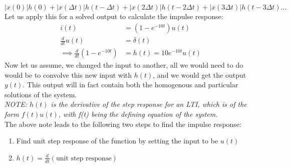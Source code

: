 \documentclass[nobib]{tufte-handout}
\begin{document}
\begin{equation*}
    |x(0)|h(0)+|x(\Delta t)|h(t-\Delta t)+|x(2\Delta t)|h(t-2\Delta t)+|x(3\Delta t)|h(t-3\Delta t)\ldots
\end{equation*}
Let us apply this for a solved output to calculate the impulse response:
\begin{align*}
    i(t)                              & = (1-e^{-10t})u(t)      \\
    \frac{d}{dt}u(t)                  & = \delta(t)             \\
    \implies \frac{d}{dt}(1-e^{-10t}) & = h(t) = 10e^{-10t}u(t)
\end{align*}
Now let us assume, we changed the input to another, all we would need to do would be to convolve this new input with $h(t)$, and we would get the output $y(t)$. This output will in fact contain both the homogenous and particular solutions of the system.\\
\textit{NOTE: $h(t)$ is the derivative of the step response for an LTI, which is of the form $f(t)u(t)$, with f(t) being the defining equation of the system.}\\
The above note leads to the following two steps to find the impulse response:
\begin{enumerate}
    \item Find unit step response of the function by setting the input to be $u(t)$
    \item $h(t) = \frac{d}{dt}(\text{unit step response})$
\end{enumerate}
\end{document}
